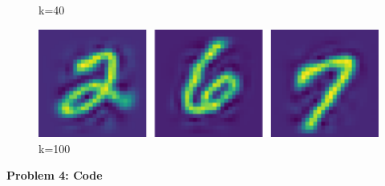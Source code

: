\begin{enumerate}
\begin{figure}[h!]
	    \caption*{k=40}
	    \includegraphics[width=0.6\linewidth]{../figures/a4_recon_100.pdf}
	    \caption*{k=100}
	\end{figure}
\end{enumerate}

{\bf Problem 4: Code}
\begin{quote}
    
\end{quote}
